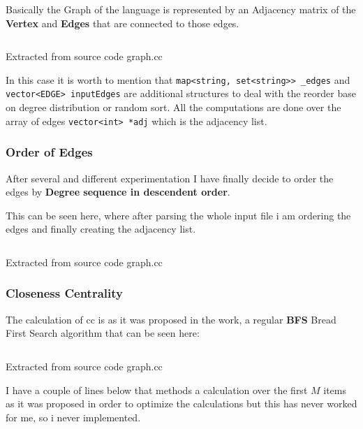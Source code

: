 \documentclass[12pt, a4paper]{article}
\begin{document}
Basically the Graph of the language is represented by an Adjacency matrix of the \textbf{Vertex} and \textbf{Edges} that are connected to those edges.

\begin{listing}[H]
    \inputminted[firstline=44, lastline=51, breaklines]{cpp}{../src/domain/graph.cc}
    \caption{Extracted from source code graph.cc}
    \label{source:code:1}
\end{listing}  

In this case it is worth to mention that \texttt{map<string, set<string>> _edges} and \texttt{vector<EDGE> inputEdges} are additional 
structures to deal with the reorder base on degree distribution or random sort. 
All the computations are done over the array of edges \texttt{vector<int> *adj} which is the adjacency list.

\subsubsection{Order of Edges}
After several and different experimentation I have finally decide to order the edges by \textbf{Degree sequence in descendent order}.

This can be seen here, where after parsing the whole input file i am ordering the edges and finally creating the adjacency list.

\begin{listing}[H]
    \inputminted[firstline=151, lastline=167, breaklines]{cpp}{../src/domain/graph.cc}
    \caption{Extracted from source code graph.cc}
    \label{source:code:2}
\end{listing}  

\subsubsection{Closeness Centrality}
The calculation of \acrshort{cc} is as it was proposed in the work, a regular \textbf{BFS} Bread First Search algorithm 
that can be seen here:

\begin{listing}[H]
    \inputminted[firstline=233, lastline=270, breaklines]{cpp}{../src/domain/graph.cc}
    \caption{Extracted from source code graph.cc}
    \label{source:code:3}
\end{listing} 

I have a couple of lines below that methods a calculation over the first $M$ items as it was 
proposed in order to optimize the calculations but this has never worked for me, so i never implemented.
\end{document}
